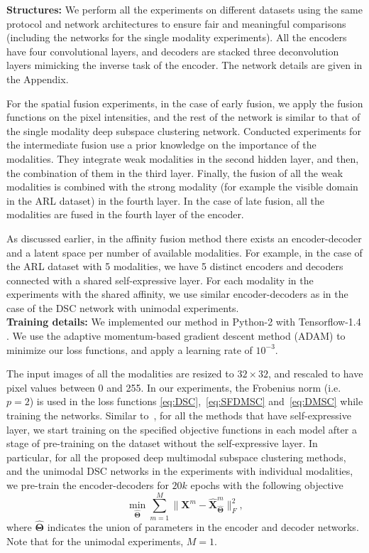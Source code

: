 \documentclass[journal]{IEEEtran}
\begin{document}
\noindent\textbf{Structures: }
We perform all the experiments on different datasets using the same protocol and network architectures to ensure fair and meaningful comparisons (including the networks for the single modality experiments).		 All the encoders have four convolutional layers, and decoders are stacked three deconvolution layers mimicking the inverse task of the encoder.  The network details are given in the Appendix.  

For the spatial fusion experiments, in the case of early fusion, we apply the fusion functions on the pixel intensities, and the rest of the network is similar to that of the single modality deep subspace clustering network.		   Conducted experiments for the intermediate fusion use a prior knowledge on the importance of the modalities.		They integrate weak modalities in the second hidden layer, and then, the combination of them in the third layer.		Finally, the fusion of all the weak modalities is combined with the strong modality (for example the visible domain in the ARL dataset) in the fourth layer.		   In the case of late fusion, all the modalities are fused in the fourth layer of the encoder.   

As discussed earlier, in the affinity fusion method there exists an encoder-decoder and a latent space per number of available modalities. For example, in the case of the ARL dataset with 5 modalities, we have 5 distinct encoders and decoders connected with a shared self-expressive layer. 		 For each modality in the experiments with the shared affinity, we use similar encoder-decoders as in the case of the DSC network \cite{deepsc17nips} with unimodal experiments.\\


\noindent\textbf{Training details: } We implemented our method in Python-2 with Tensorflow-1.4 \cite{abadi2016tensorflow}. We use the adaptive momentum-based gradient descent method (ADAM) \cite{kingma2014adam} to minimize our loss functions, and apply a learning rate of $10^{-3}$.

The input images of all the modalities are resized to $32\times32$, and rescaled to have pixel values between 0 and 255.  In our experiments, the Frobenius norm (i.e. $p=2$) is used in the loss functions \eqref{eq:DSC},~\eqref{eq:SFDMSC} and~\eqref{eq:DMSC} while training the networks.  Similar to~\cite{deepsc17nips}, for all the methods that have self-expressive layer, we start training on the specified objective functions in each model after a stage of pre-training on the dataset without the self-expressive layer.		  In particular, for all the proposed deep multimodal subspace clustering methods, and the unimodal DSC networks in the experiments with individual modalities, we pre-train the encoder-decoders for $20k$ epochs with the following objective
$$
\min_{\hat{\boldsymbol{\Theta}}} \sum_{m=1}^{M} \| \mathbf{X}^m -  \hat{\mathbf{X}}_{\hat{\boldsymbol{\Theta}}}^m\|^2_F,
$$ 
where $\hat{\boldsymbol{\Theta}}$ indicates the union of parameters in the encoder and decoder networks.		Note that for the unimodal experiments, $M=1$.
\end{document}
